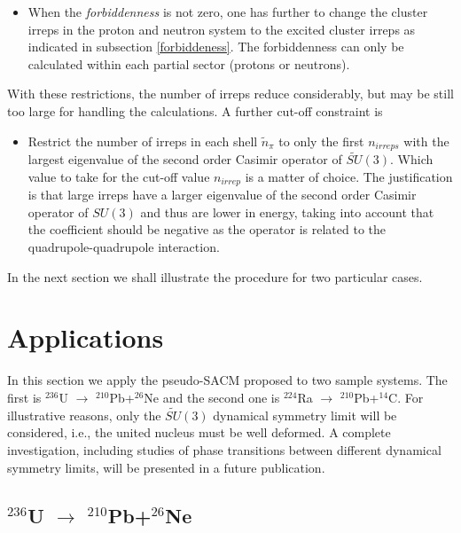 \documentclass[12pt]{article}
\begin{document}
\begin{itemize}
\item When the {\it forbiddenness} is not zero, one has further to change the cluster irreps in the proton
and neutron system to the excited cluster irreps as indicated in subsection \ref{forbiddeness}.
The forbiddenness can only be calculated within each partial sector (protons or neutrons). 

\end{itemize}

With these restrictions, the number of irreps reduce considerably, but may be still 
too large for handling the calculations. A further cut-off constraint is 


\begin{itemize}

\item Restrict the number of irreps in each shell $\tilde{n}_\pi$ to only the first $n_{irreps}$
with the largest eigenvalue of the second order Casimir operator of $\widetilde{SU}(3)$.
Which value to take for the cut-off value $n_{irrep}$ is a matter of choice. The justification is
that large irreps have a larger eigenvalue of the second order Casimir operator of $SU(3)$ and thus are 
lower in energy, taking into account that the coefficient should be negative as the operator
is related to the quadrupole-quadrupole interaction.

\end{itemize}

In the next section we shall illustrate the procedure for two particular cases. 


\section{Applications}
\label{examples}

In this section we apply the pseudo-SACM proposed to two
sample systems. The first is
$^{236}$U $ \rightarrow$ $^{210}$Pb+$^{26}$Ne and the second one is
$^{224}$Ra $\rightarrow$ $^{210}$Pb+$^{14}$C.
For illustrative reasons, only the $\widetilde{SU}(3)$ dynamical symmetry limit will be
considered, i.e., the united nucleus must be well deformed.
A complete investigation, including studies of phase transitions between different
dynamical symmetry limits, will be presented in a future publication. 

\subsection{$^{236}$U $ \rightarrow$ $^{210}$Pb+$^{26}$Ne}
\end{document}
